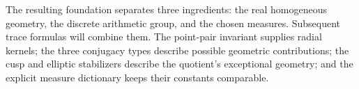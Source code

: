 The resulting foundation separates three ingredients: the real homogeneous geometry, the discrete arithmetic group, and the chosen measures. Subsequent trace formulas will combine them. The point-pair invariant supplies radial kernels; the three conjugacy types describe possible geometric contributions; the cusp and elliptic stabilizers describe the quotient's exceptional geometry; and the explicit measure dictionary keeps their constants comparable.

